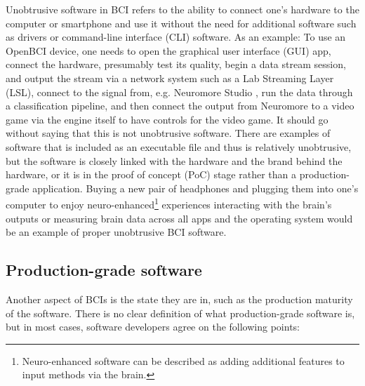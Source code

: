 Unobtrusive software in BCI refers to the ability to connect one's hardware to the computer or smartphone and use it without the need for additional software such as drivers or command-line interface (CLI) software. As an example: To use an OpenBCI device, one needs to open the graphical user interface (GUI) app, connect the hardware, presumably test its quality, begin a data stream session, and output the stream via a network system such as a Lab Streaming Layer (LSL), connect to the signal from, e.g. Neuromore Studio \citep{openbci_neuromore_nodate}, run the data through a classification pipeline, and then connect the output from Neuromore to a video game via the engine itself to have controls for the video game. It should go without saying that this is not unobtrusive software. There are examples of software that is included as an executable file and thus is relatively unobtrusive, but the software is closely linked with the hardware and the brand behind the hardware, or it is in the proof of concept (PoC) stage rather than a production-grade application. Buying a new pair of headphones and plugging them into one's computer to enjoy neuro-enhanced\footnote{Neuro-enhanced software can be described as adding additional features to input methods via the brain.} experiences interacting with the brain's outputs or measuring brain data across all apps and the operating system would be an example of proper unobtrusive BCI software.

\subsection{Production-grade software}
\label{chapter2-production-grade-software}

Another aspect of BCIs is the state they are in, such as the production maturity of the software. There is no clear definition of what production-grade software is, but in most cases, software developers agree on the following points:

